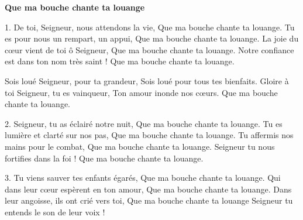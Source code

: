\textbf{Que ma bouche chante ta louange}

1. De toi, Seigneur, nous attendons la vie, Que ma bouche chante ta louange. Tu es pour nous un rempart, un appui, Que ma bouche chante ta louange. La joie du cœur vient de toi ô Seigneur, Que ma bouche chante ta louange. Notre confiance est dans ton nom très saint ! Que ma bouche chante ta louange.

\smallskip
Sois loué Seigneur, pour ta grandeur, Sois loué pour tous tes bienfaits.
Gloire à toi Seigneur, tu es vainqueur, Ton amour inonde nos cœurs. Que ma bouche chante ta louange.
\smallskip

2. Seigneur, tu as éclairé notre nuit, Que ma bouche chante ta louange.
Tu es lumière et clarté sur nos pas, Que ma bouche chante ta louange.
Tu affermis nos mains pour le combat, Que ma bouche chante ta louange.
Seigneur tu nous fortifies dans la foi ! Que ma bouche chante ta louange.

3. Tu viens sauver tes enfants égarés, Que ma bouche chante ta louange.
Qui dans leur cœur espèrent en ton amour, Que ma bouche chante ta louange. Dans leur angoisse, ils ont crié vers toi, Que ma bouche chante ta louange Seigneur tu entends le son de leur voix !
